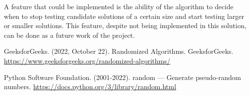 \documentclass[...]{revdetua}
\begin{document}
A feature that could be implemented is the ability of the algorithm to decide when  to  stop  testing  candidate solutions  of  a  certain  size  and  start  testing larger or smaller solutions. This feature, despite not being implemented in this solution, can be done as a future work of the project.

\begin{thebibliography}{9}

GeeksforGeeks. (2022, October 22). Randomized Algorithms. GeeksforGeeks. \url{https://www.geeksforgeeks.org/randomized-algorithms/}

Python Software Foundation. (2001-2022). random — Generate pseudo-random numbers. 
\url{https://docs.python.org/3/library/random.html}

\end{thebibliography}


\end{document}
